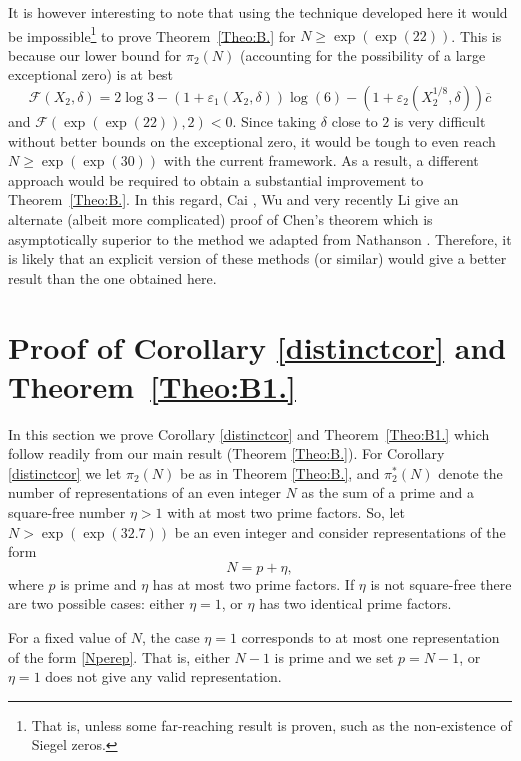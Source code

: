 \documentclass[12pt]{amsart}
\begin{document}
It is however interesting to note that using the technique developed here it would be impossible\footnote{That is, unless some far-reaching result is proven, such as the non-existence of Siegel zeros.} to prove Theorem~\ref{Theo:B.} for $N\ge \exp( \exp(22))$. This is because our lower bound for $\pi_2(N)$ (accounting for the possibility of a large exceptional zero) is at best
\begin{equation*} \label{eq-fancy-F}
\mathcal{F}(X_2,\delta)=2\log 3- (1+\varepsilon_1(X_2,\delta))\log(6)-(1+\varepsilon_2(X_2^{1/8},\delta))\overline{c}
\end{equation*}
and $\mathcal{F}(\exp( \exp(22)),2)<0$. Since taking $\delta$ close to $2$ is very difficult without better bounds on the exceptional zero, it would be tough to even reach $N \ge \exp( \exp(30))$ with the current framework. As a result, a different approach would be required to obtain a substantial improvement to Theorem~\ref{Theo:B.}. In this regard, Cai \cite{Cai1}, Wu \cite{Wu1} and very recently Li \cite{li2024} give an alternate (albeit more complicated) proof of Chen's theorem which is asymptotically superior to the method we adapted from Nathanson \cite{Nathanson}. Therefore, it is likely that an explicit version of these methods (or similar) would give a better result than the one obtained here.


\section{Proof of Corollary \ref{distinctcor} and Theorem~\ref{Theo:B1.}}
\label{section:B1}
In this section we prove Corollary \ref{distinctcor} and Theorem~\ref{Theo:B1.} which follow readily from our main result (Theorem \ref{Theo:B.}). For Corollary \ref{distinctcor} we let $\pi_2(N)$ be as in Theorem \ref{Theo:B.}, and \label{def-pi2-*} $\pi_2^*(N)$ denote the number of representations of an even integer $N$ as the sum of a prime and a square-free number $\eta>1$ with at most two prime factors.
So, let $N>\exp(\exp(32.7))$ be an even integer and consider representations of the form
\begin{equation}\label{Nperep}
    N=p+\eta,
\end{equation}
where $p$ is prime and $\eta$ has at most two prime factors. If $\eta$ is not square-free there are two possible cases: either $\eta=1$, or $\eta$ has two identical prime factors.

For a fixed value of $N$, the case $\eta=1$ corresponds to at most one representation of the form \eqref{Nperep}. That is, either $N-1$ is prime and we set $p=N-1$, or $\eta=1$ does not give any valid representation.
\end{document}
